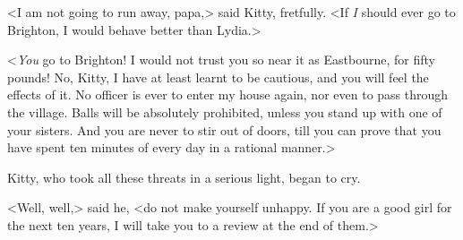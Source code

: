 <I am not going to run away, papa,> said Kitty, fretfully. <If \textit{I} should ever go to Brighton, I would behave better than Lydia.>

<\textit{You} go to Brighton! I would not trust you so near it as Eastbourne, for fifty pounds! No, Kitty, I have at least learnt to be cautious, and you will feel the effects of it. No officer is ever to enter my house again, nor even to pass through the village. Balls will be absolutely prohibited, unless you stand up with one of your sisters. And you are never to stir out of doors, till you can prove that you have spent ten minutes of every day in a rational manner.>

Kitty, who took all these threats in a serious light, began to cry.

<Well, well,> said he, <do not make yourself unhappy. If you are a good girl for the next ten years, I will take you to a review at the end of them.>